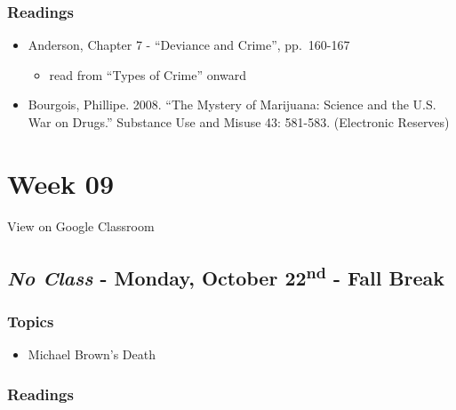 \documentclass[]{book}
\providecommand{\tightlist}{%
  \setlength{\itemsep}{0pt}\setlength{\parskip}{0pt}}
\theoremstyle{definition}
\theoremstyle{definition}
\theoremstyle{definition}
\theoremstyle{remark}
\begin{document}
\hypertarget{readings-14}{%
\subsubsection*{Readings}\label{readings-14}}

\begin{itemize}
\tightlist
\item
  Anderson, Chapter 7 - ``Deviance and Crime'', pp.~160-167

  \begin{itemize}
  \tightlist
  \item
    read from ``Types of Crime'' onward
  \end{itemize}
\item
  Bourgois, Phillipe. 2008. ``The Mystery of Marijuana: Science and the
  U.S. War on Drugs.'' Substance Use and Misuse 43: 581-583. (Electronic
  Reserves)
\end{itemize}

\hypertarget{week-09}{%
\section*{Week 09}\label{week-09}}

View on Google Classroom

\hypertarget{no-class---monday-october-22nd---fall-break}{%
\subsection*{\texorpdfstring{\emph{No Class} - Monday, October
22\textsuperscript{nd} - Fall
Break}{No Class - Monday, October 22nd - Fall Break}}\label{no-class---monday-october-22nd---fall-break}}

\hypertarget{topics-16}{%
\subsubsection*{Topics}\label{topics-16}}

\begin{itemize}
\tightlist
\item
  Michael Brown's Death
\end{itemize}

\hypertarget{readings-15}{%
\subsubsection*{Readings}\label{readings-15}}
\end{document}
